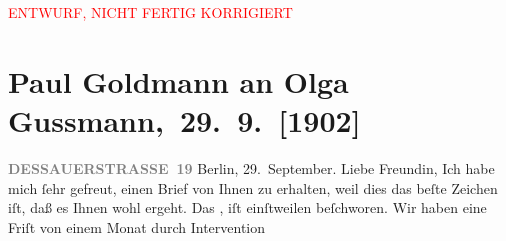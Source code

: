 
\begin{center}
            \textcolor{red}{ENTWURF, NICHT FERTIG KORRIGIERT}
                      \end{center}
            
         
         \renewcommand{\erwaehntePersonen}{Personen: Rudolf Gussmann, Olga Schnitzler, Heinrich Schnitzler, Elisabeth Steinrück}
         \renewcommand{\erwaehnteInstitutionen}{Institutionen: Preußische Polzei, Schiller-Theater}
         \renewcommand{\erwaehnteOrte}{Orte: Berlin, Dessauer Straße, Gentzgasse, Hinterbrühl, Preußen, Wien}
         \renewcommand{\erwaehnteWerke}{}
               \section[ Paul Goldmann an Olga Gussmann, 29. 9. {[}1902{]}]{ Paul Goldmann an Olga Gussmann, 29. 9. {[}1902{]}}\nopagebreak{}\rehead{ }\begin{ledgroupsized}[t]{13cm}\normalsize\beginnumbering \toendnotes[C]{\smallbreak\pagebreak[2]} 
\toendnotes[C]{\smallbreak}\pstart
           \noindent{}\raggedleft{}{\pb}\textcolor{gray}{\textbf{DESSAUERSTRASSE 19}}\pend
           \pstart
           Berlin, 29. September.\pend
           \pstart\center{}Liebe Freundin,\pend\pstart
           Ich habe mich ſehr gefreut, einen Brief von Ihnen zu erhalten, weil dies das beſte
               Zeichen iſt, daß es Ihnen wohl ergeht.\pend
           \pstart
           Das \label{K_L03534-1v}\label{K_L03534-1h},
               iſt einſtweilen beſchworen. Wir haben eine Friſt von einem Monat durch Intervention

\end{ledgroupsized}
